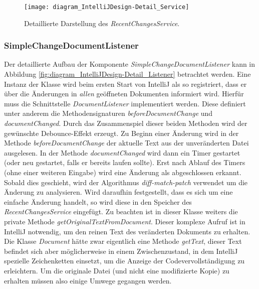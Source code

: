 \begin{figure}
    \centering
    \texttt{[image: diagram\_IntelliJDesign-Detail\_Service]}
    \caption{Detaillierte Darstellung des \emph{RecentChangesService}.}
    \label{fig:diagram_IntelliJDesign-Detail_Service}
\end{figure}

\subsubsection{SimpleChangeDocumentListener}

Der detaillierte Aufbau der Komponente \emph{SimpleChangeDocumentListener}
kann in Abbildung \ref{fig:diagram_IntelliJDesign-Detail_Listener} betrachtet werden.
Eine Instanz der Klasse wird beim ersten Start von IntelliJ als so registriert, 
dass er über die Änderungen in \emph{allen} geöffneten Dokumenten informiert wird. 
Hierfür muss die Schnittstelle \emph{DocumentListener} implementiert werden.
Diese definiert unter anderem die Methodensignaturen \emph{beforeDocumentChange}
und \emph{documentChanged}. Durch das Zusammenspiel dieser beiden Methoden
wird der gewünschte Debounce-Effekt erzeugt. Zu Beginn einer Änderung
wird in der Methode \emph{beforeDocumentChange} der aktuelle Text aus der 
unveränderten Datei ausgelesen. In der Methode \emph{documentChanged} wird
dann ein Timer gestartet (oder neu gestartet, falls er bereits laufen sollte).
Erst nach Ablauf des Timers (ohne einer weiteren Eingabe) wird
eine Änderung als abgeschlossen erkannt. Sobald dies geschieht, wird 
der Algorithmus \emph{diff-match-patch} verwendet um die Änderung zu analysieren.
Wird daraufhin festgestellt, dass es sich um eine einfache Änderung handelt,
so wird diese in den Speicher des \emph{RecentChangesService} eingefügt.
Zu beachten ist in dieser Klasse weiters die private Methode 
\emph{getOriginalTextFromDocument}. Dieser komplexe Aufruf
ist in IntelliJ notwendig, um den reinen Text des veränderten Dokuments
zu erhalten. Die Klasse \emph{Document} hätte zwar eigentlich
eine Methode \emph{getText}, dieser Text befindet sich aber möglicherweise
in einem Zwischenzustand, in dem IntelliJ spezielle Zeichenketten 
einsetzt, um die Anzeige der Codevervollständigung zu erleichtern.
Um die originale Datei (und nicht eine modifizierte Kopie) zu erhalten
müssen also einige Umwege gegangen werden.

